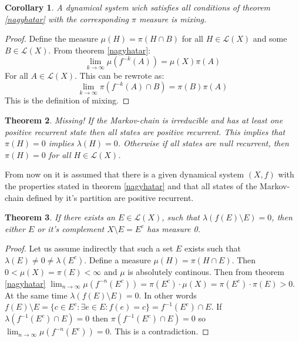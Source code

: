 \documentclass{article}
\newtheorem{theorem}{Theorem}[section]
\newtheorem{cor}[theorem]{Corollary}
\begin{document}
\begin{cor} \label{mix}
A dynamical system wich satisfies all conditions of theorem \ref{nagyhatar} with the corresponding $\pi$ measure is mixing.
\end{cor}

\begin{proof}
Define the measure $\mu(H) = \pi(H \cap B)$ for all $H \in \mathscr{L}(X)$ and some $B \in \mathscr{L}(X)$. From theorem \ref{nagyhatar}:\[
\lim_{k \rightarrow \infty} \mu(f^{-k}(A)) = \mu(X)\pi(A)
\]
For all $A \in \mathscr{L}(X)$. This can be rewrote as:\[
\lim_{k \rightarrow \infty} \pi(f^{-k}(A) \cap B) = \pi(B)\pi(A)
\]
This is the definition of mixing.
\end{proof}

\begin{theorem}
Missing! If the Markov-chain is irreducible and has at least one positive recurrent state then all states are positive recurrent. This implies that $\pi(H)=0$ implies $\lambda(H)=0$. Otherwise if all states are null recurrent, then $\pi(H)=0$ for all $H \in \mathscr{L}(X)$.
\end{theorem}

From now on it is assumed that there is a given dynamical system $(X,f)$ with the properties stated in theorem \ref{nagyhatar} and that all states of the Markov-chain defined by it's partition are positive recurrent.

\begin{theorem}
If there exists an $E \in \mathscr{L}(X)$, such that $\lambda( f(E) \setminus E ) = 0$, then either $E$ or it's complement $X\setminus E = E^c$ has measure 0.
\end{theorem}

\begin{proof}
Let us assume indirectly that such a set $E$ exists such that $\lambda(E)\neq 0 \neq \lambda(E^c)$. Define a measure $\mu(H) = \pi(H \cap E)$. Then $0 < \mu(X) = \pi(E) < \infty$ and $\mu$ is absolutely continous. Then from theorem \ref{nagyhatar} $\lim_{n\rightarrow \infty}\mu(f^{-n}(E^c)) = \pi(E^c)\cdot \mu(X) = \pi(E^c)\cdot \pi(E) > 0$.\\

At the same time $\lambda( f(E) \setminus E ) = 0$. In other words $f(E) \setminus E = \{c\in E^c: \exists e\in E: f(e)=c\} = f^ {-1}(E^c) \cap E$. If $\lambda(f^ {-1}(E^c) \cap E) = 0$ then $\pi(f^ {-1}(E^c) \cap E) = 0$ so $\lim_{n\rightarrow \infty}\mu(f^{-n}(E^c)) = 0$. This is a contradiction.
\end{proof}
\end{document}
